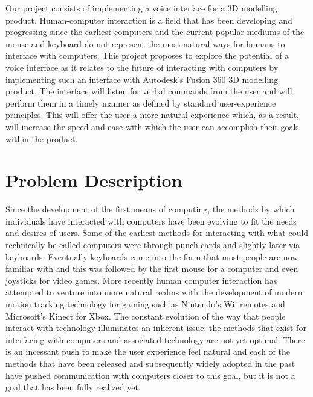 \documentclass[10pt, draftclsnofoot, onecolumn]{IEEEtran}
\title{}
\author{Austin Row \\
CS 461 \\
NLP for Digital Manufacturing-Problem Statement \\
Fall 2017 \\}
\date{October 2017}
\begin{document}
\maketitle

Our project consists of implementing a voice interface for a 3D modelling product. Human-computer interaction is a field that has been developing and progressing since the earliest computers and the current popular mediums of the mouse and keyboard do not represent the most natural ways for humans to interface with computers. This project proposes to explore the potential of a voice interface as it relates to the future of interacting with computers by implementing such an interface with Autodesk’s Fusion 360 3D modelling product. The interface will listen for verbal commands from the user and will perform them in a timely manner as defined by standard user-experience principles. This will offer the user a more natural experience which, as a result, will increase the speed and ease with which the user can accomplish their goals within the product.

\clearpage

\section*{Problem Description}
Since the development of the first means of computing, the methods by which individuals have interacted with computers have been evolving to fit the needs and desires of users. Some of the earliest methods for interacting with what could technically be called computers were through punch cards and slightly later via keyboards. Eventually keyboards came into the form that most people are now familiar with and this was followed by the first mouse for a computer and even joysticks for video games. More recently human computer interaction has attempted to venture into more natural realms with the development of modern motion tracking technology for gaming such as Nintendo’s Wii remotes and Microsoft’s Kinect for Xbox. The constant evolution of the way that people interact with technology illuminates an inherent issue: the methods that exist for interfacing with computers and associated technology are not yet optimal. There is an incessant push to make the user experience feel natural and each of the methods that have been released and subsequently widely adopted in the past have pushed communication with computers closer to this goal, but it is not a goal that has been fully realized yet. \\ 
\end{document}
